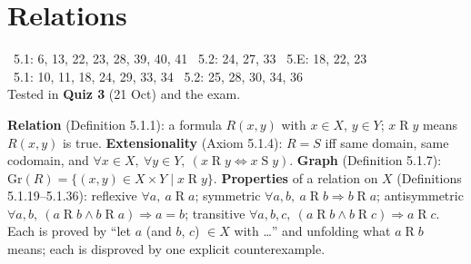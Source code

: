 \chapter{Relations}
%
{\fE\ 5.1: 6, 13, 22, 23, 28, 39, 40, 41 \textperiodcentered\ 5.2: 24, 27, 33 \textperiodcentered\ 5.E: 18, 22, 23\\ \fR\ 5.1: 10, 11, 18, 24, 29, 33, 34 \textperiodcentered\ 5.2: 25, 28, 30, 34, 36\\ Tested in \textbf{Quiz 3} (21 Oct) and the exam.}


\begin{key}
\textbf{Relation} (Definition 5.1.1): a formula $R(x,y)$ with $x\in X$, $y\in Y$; $x\mathrel Ry$ means $R(x,y)$ is true. \textbf{Extensionality} (Axiom 5.1.4): $R=S$ iff same domain, same codomain, and $\forall x\in X,\ \forall y\in Y,\ (x\mathrel Ry\Leftrightarrow x\mathrel Sy)$. \textbf{Graph} (Definition 5.1.7): $\mathrm{Gr}(R)=\{(x,y)\in X\times Y\mid x\mathrel Ry\}$. \textbf{Properties} of a relation on $X$ (Definitions 5.1.19--5.1.36): reflexive $\forall a,\ a\mathrel Ra$; symmetric $\forall a,b,\ a\mathrel Rb\Rightarrow b\mathrel Ra$; antisymmetric $\forall a,b,\ (a\mathrel Rb\wedge b\mathrel Ra)\Rightarrow a=b$; transitive $\forall a,b,c,\ (a\mathrel Rb\wedge b\mathrel Rc)\Rightarrow a\mathrel Rc$. Each is proved by ``let $a$ (and $b$, $c$) $\in X$ with \dots'' and unfolding what $a\mathrel Rb$ means; each is disproved by one explicit counterexample.
\end{key}

